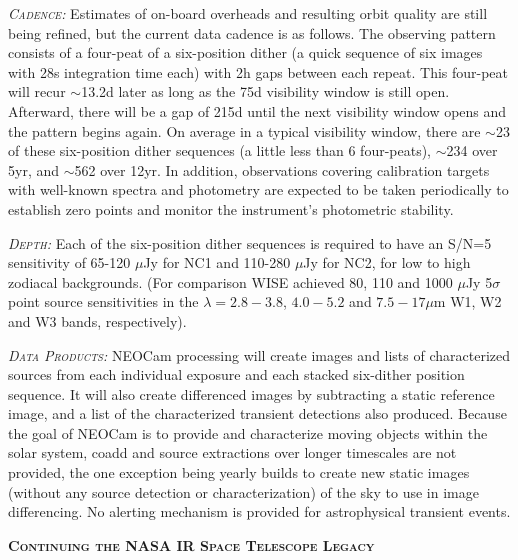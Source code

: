 \documentclass[12pt]{article}
\begin{document}
\smallskip
\smallskip
\noindent
\textsl{\textsc{Cadence:}} Estimates of on-board overheads and resulting orbit quality are still being refined, but the current data cadence is as follows. The observing pattern consists of a four-peat of a six-position dither (a quick sequence of six images with 28s integration time each) with 2h gaps between each repeat. This four-peat will recur $\sim$13.2d later as long as the 75d visibility window is still open. Afterward, there will be a gap of 215d until the next visibility window opens and the pattern begins again. On average in a typical visibility window, there are $\sim$23 of these six-position dither sequences (a little less than 6 four-peats), $\sim$234 over 5yr, and $\sim$562 over 12yr. In addition, observations covering calibration targets with well-known spectra and photometry are expected to be taken periodically to establish zero points and monitor the instrument's photometric stability. 

\smallskip
\smallskip
\noindent
\textsl{\textsc{Depth:}} Each of the six-position dither sequences is required to have an S/N=5 sensitivity of 65-120 $\mu$Jy for NC1 and 110-280 $\mu$Jy for NC2, for low to high zodiacal backgrounds. (For comparison WISE achieved 80, 110 and 1000 $\mu$Jy 5$\sigma$ point source sensitivities in the $\lambda=2.8-3.8$, $4.0-5.2$ and $7.5-17\mu$m W1, W2 and W3 bands, respectively).

\smallskip
\smallskip
\noindent
\textsl{\textsc{Data Products:}} NEOCam processing will create images and lists of characterized sources from each individual exposure and each stacked six-dither position sequence. It will also create differenced images by subtracting a static reference image, and a list of the characterized transient detections also produced. Because the goal of NEOCam is to provide and characterize moving objects within the solar system, coadd and source extractions over longer timescales are not provided, the one exception being yearly builds to create new static images (without any source detection or characterization) of the sky to use in image differencing. No alerting mechanism is provided for astrophysical transient events.  

\smallskip
\smallskip
\noindent
{\bfseries \textsc{\textcolor{Cerulean}{Continuing the NASA IR Space Telescope Legacy}}} 
\end{document}
